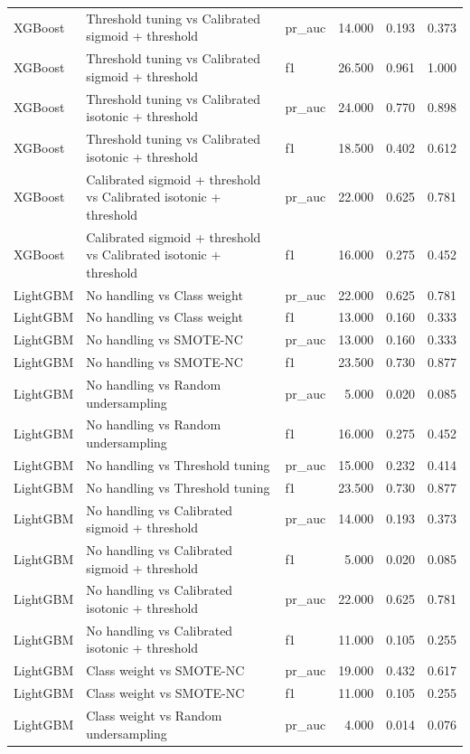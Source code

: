 \begin{tabular}{lllrrr}
XGBoost & Threshold tuning vs Calibrated sigmoid + threshold & pr_auc & 14.000 & 0.193 & 0.373 \\
XGBoost & Threshold tuning vs Calibrated sigmoid + threshold & f1 & 26.500 & 0.961 & 1.000 \\
XGBoost & Threshold tuning vs Calibrated isotonic + threshold & pr_auc & 24.000 & 0.770 & 0.898 \\
XGBoost & Threshold tuning vs Calibrated isotonic + threshold & f1 & 18.500 & 0.402 & 0.612 \\
XGBoost & Calibrated sigmoid + threshold vs Calibrated isotonic + threshold & pr_auc & 22.000 & 0.625 & 0.781 \\
XGBoost & Calibrated sigmoid + threshold vs Calibrated isotonic + threshold & f1 & 16.000 & 0.275 & 0.452 \\
LightGBM & No handling vs Class weight & pr_auc & 22.000 & 0.625 & 0.781 \\
LightGBM & No handling vs Class weight & f1 & 13.000 & 0.160 & 0.333 \\
LightGBM & No handling vs SMOTE-NC & pr_auc & 13.000 & 0.160 & 0.333 \\
LightGBM & No handling vs SMOTE-NC & f1 & 23.500 & 0.730 & 0.877 \\
LightGBM & No handling vs Random undersampling & pr_auc & 5.000 & 0.020 & 0.085 \\
LightGBM & No handling vs Random undersampling & f1 & 16.000 & 0.275 & 0.452 \\
LightGBM & No handling vs Threshold tuning & pr_auc & 15.000 & 0.232 & 0.414 \\
LightGBM & No handling vs Threshold tuning & f1 & 23.500 & 0.730 & 0.877 \\
LightGBM & No handling vs Calibrated sigmoid + threshold & pr_auc & 14.000 & 0.193 & 0.373 \\
LightGBM & No handling vs Calibrated sigmoid + threshold & f1 & 5.000 & 0.020 & 0.085 \\
LightGBM & No handling vs Calibrated isotonic + threshold & pr_auc & 22.000 & 0.625 & 0.781 \\
LightGBM & No handling vs Calibrated isotonic + threshold & f1 & 11.000 & 0.105 & 0.255 \\
LightGBM & Class weight vs SMOTE-NC & pr_auc & 19.000 & 0.432 & 0.617 \\
LightGBM & Class weight vs SMOTE-NC & f1 & 11.000 & 0.105 & 0.255 \\
LightGBM & Class weight vs Random undersampling & pr_auc & 4.000 & 0.014 & 0.076 \\

\end{tabular}
